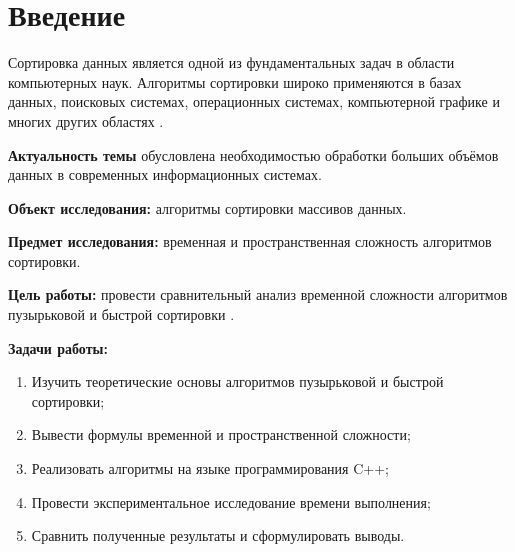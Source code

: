 \section{Введение}

Сортировка данных является одной из фундаментальных задач в области компьютерных наук. Алгоритмы сортировки широко применяются в базах данных, поисковых системах, операционных системах, компьютерной графике и многих других областях \cite{knuth1998art}.

\textbf{Актуальность темы} обусловлена необходимостью обработки больших объёмов данных в современных информационных системах.

\textbf{Объект исследования:} алгоритмы сортировки массивов данных.

\textbf{Предмет исследования:} временная и пространственная сложность алгоритмов сортировки.

\textbf{Цель работы:} провести сравнительный анализ временной сложности алгоритмов пузырьковой и быстрой сортировки \cite{hoare1962quicksort}.

\textbf{Задачи работы:}
\begin{enumerate}
    \item Изучить теоретические основы алгоритмов пузырьковой и быстрой сортировки;
    \item Вывести формулы временной и пространственной сложности;
    \item Реализовать алгоритмы на языке программирования C++;
    \item Провести экспериментальное исследование времени выполнения;
    \item Сравнить полученные результаты и сформулировать выводы.
\end{enumerate}